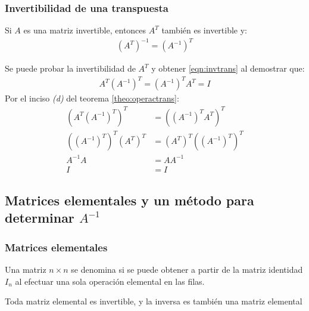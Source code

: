 \documentclass[a4paper,12pt]{article}
\begin{document}
\subsubsection{Invertibilidad de una transpuesta}

\begin{theorem}
  Si $A$ es una matriz invertible, entonces $A^T$ también es invertible y:
  \begin{align}
    \left( A^T \right)^{-1} = \left( A^{-1} \right)^T
    \label{eqn:invtrans}
  \end{align}
  \label{theo:invtrans}
\end{theorem}

\demo Se puede probar la invertibilidad de $A^T$ y obtener \eqref{eqn:invtrans}
al demostrar que:
\begin{align*}
  A^T\left( A^{-1} \right)^T = \left( A^{-1} \right)^T A^T = I
\end{align*}
Por el inciso \emph{(d)} del teorema \ref{theo:operactrans}:
\begin{align*}
  \left( A^T\left( A^{-1} \right)^T \right)^T &= \left( \left( A^{-1} \right)^T
  A^T \right)^T \\
  \left( \left( A^{-1} \right)^T \right)^T \left( A^T \right)^T &= \left( A^T
  \right)^T \left( \left( A^{-1} \right)^T \right)^T \\
  A^{-1}A &= AA^{-1} \\
  I &= I
\end{align*}


\subsection{Matrices elementales y un método para determinar $A^{-1}$}

\subsubsection{Matrices elementales}

\begin{concept}
  Una matriz $n\times n$ se denomina  si se puede obtener
  a partir de la matriz identidad $I_n$ al efectuar una sola operación
  elemental en las filas.
\end{concept}

\begin{theorem}
  Toda matriz elemental es invertible, y la inversa es también una matriz
  elemental
  \label{theo:elematr}
\end{theorem}
\end{document}
